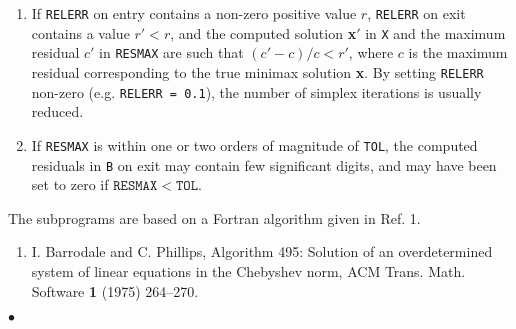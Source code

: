 \begin{enumerate}
\item  If {\tt RELERR} on entry contains a non-zero positive value $r$,
{\tt RELERR} on exit contains a value $r'<r$,
and the computed solution {\bf x}$'$ in {\tt X} and the maximum residual
$c'$ in {\tt RESMAX} are such that $(c'-c)/c < r'$,
where $c$ is the maximum residual corresponding to the true minimax
solution {\bf x}.  By setting {\tt RELERR} non-zero (e.g.
{\tt RELERR = 0.1}), the number of simplex iterations is usually reduced.
\item If {\tt RESMAX} is within one or two orders of magnitude of
{\tt TOL}, the computed residuals in {\tt B}
on exit may contain few significant digits, and may have been set to
zero if $\mathtt{RESMAX < TOL}$.
\end{enumerate}
\Source
The subprograms are based on a Fortran algorithm given in Ref. 1.
\Refer
\begin{enumerate}
\item I. Barrodale and C. Phillips, Algorithm 495:
Solution of an overdetermined system of linear equations in the
Chebyshev norm, ACM Trans. Math. Software {\bf 1} (1975) 264--270.
\end{enumerate}
$\bullet$
